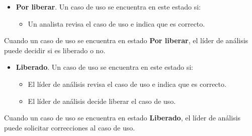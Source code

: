 	\begin{itemize}
		\item \textbf{Por liberar}. Un caso de uso se encuentra en este estado si:
		\begin{itemize}
			\item Un analista revisa el caso de uso e indica que es correcto.
		\end{itemize}
	\end{itemize}
	Cuando un caso de uso se encuentra en estado \textbf{Por liberar}, el líder de análisis puede decidir si es liberado o no.
	
	\begin{itemize}
		\item \textbf{Liberado}. Un caso de uso se encuentra en este estado si:
		\begin{itemize}
			\item El líder de análisis revisa el caso de uso e indica que es correcto.
			\item El líder de análisis decide liberar el caso de uso.
		\end{itemize}
	\end{itemize}
	Cuando un caso de uso se encuentra en estado \textbf{Liberado}, el líder de análisis puede solicitar correcciones al caso de uso.